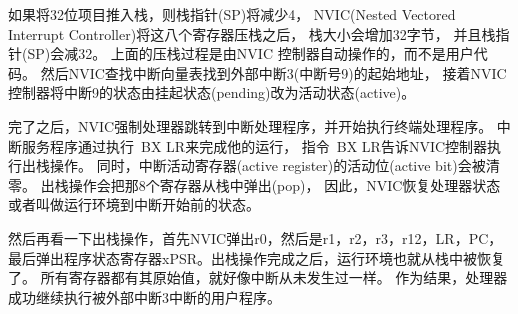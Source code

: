 如果将32位项目推入栈，则栈指针(SP)将减少4，
NVIC(Nested Vectored Interrupt Controller)将这八个寄存器压栈之后，
栈大小会增加32字节，
并且栈指针(SP)会减32。
上面的压栈过程是由NVIC 控制器自动操作的，而不是用户代码。
然后NVIC查找中断向量表找到外部中断3(中断号9)的起始地址，
接着NVIC控制器将中断9的状态由挂起状态(pending)改为活动状态(active)。

完了之后，NVIC强制处理器跳转到中断处理程序，并开始执行终端处理程序。
中断服务程序通过执行~BX LR来完成他的运行，
指令~BX LR告诉NVIC控制器执行出栈操作。
同时，中断活动寄存器(active register)的活动位(active bit)会被清零。
出栈操作会把那8个寄存器从栈中弹出(pop)，
因此，NVIC恢复处理器状态或者叫做运行环境到中断开始前的状态。

然后再看一下出栈操作，首先NVIC弹出r0，然后是r1，r2，r3，r12，LR，PC，
最后弹出程序状态寄存器xPSR。出栈操作完成之后，运行环境也就从栈中被恢复了。
所有寄存器都有其原始值，就好像中断从未发生过一样。
作为结果，处理器成功继续执行被外部中断3中断的用户程序。

